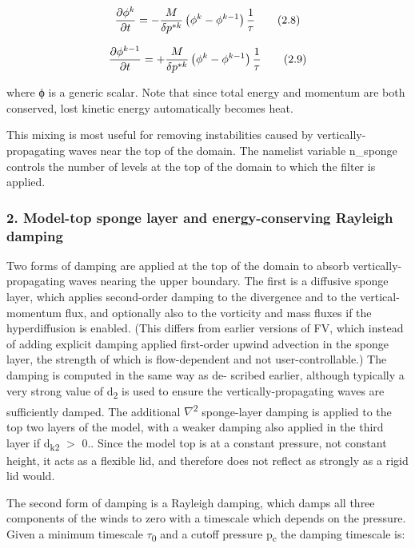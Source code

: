 \[ \frac{\partial \phi^k}{\partial t} = - \frac{M}{\delta p^{*k} } \left(\phi^k - \phi^{k-1} \right) \frac{1}{\tau} \\ \tag {2.8} \]

\[ \frac{\partial \phi^{k-1}}{\partial t} = + \frac{M}{\delta p^{*k} } \left(\phi^k - \phi^{k-1} \right) \frac{1}{\tau} \\ \tag {2.9} \]

where ϕ is a generic scalar. Note that since total energy and momentum are both conserved, lost kinetic energy automatically becomes heat.

This mixing is most useful for removing instabilities caused by vertically-\/ propagating waves near the top of the domain. The namelist variable {\ttfamily n\+\_\+sponge} controls the number of levels at the top of the domain to which the filter is applied.

\subsubsection*{2. Model-\/top sponge layer and energy-\/conserving Rayleigh damping}

Two forms of damping are applied at the top of the domain to absorb vertically-\/ propagating waves nearing the upper boundary. The first is a diffusive sponge layer, which applies second-\/order damping to the divergence and to the vertical-\/momentum flux, and optionally also to the vorticity and mass fluxes if the hyperdiffusion is enabled. (This differs from earlier versions of FV\textthreesuperior{}, which instead of adding explicit damping applied first-\/order upwind advection in the sponge layer, the strength of which is flow-\/dependent and not user-\/controllable.) The damping is computed in the same way as de-\/ scribed earlier, although typically a very strong value of d\textsubscript{2} is used to ensure the vertically-\/propagating waves are sufficiently damped. The additional {$\nabla$}\textsuperscript{2} sponge-\/layer damping is applied to the top two layers of the model, with a weaker damping also applied in the third layer if d\textsubscript{k2} $>$ 0.. Since the model top is at a constant pressure, not constant height, it acts as a flexible lid, and therefore does not reflect as strongly as a rigid lid would.

The second form of damping is a Rayleigh damping, which damps all three components of the winds to zero with a timescale which depends on the pressure. Given a minimum timescale {$\tau$}\textsubscript{0} and a cutoff pressure p\textsubscript{c} the damping timescale is\+:

